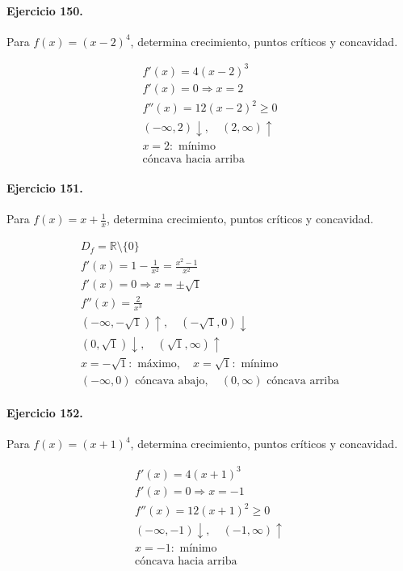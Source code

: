 \documentclass[11pt,a4paper]{article}
\begin{document}
\paragraph{Ejercicio 150.} Para $f(x)=(x-2)^4$, determina crecimiento, puntos críticos y concavidad.

\[
\begin{aligned}
f'(x)=4(x-2)^3\\
f'(x)=0\Rightarrow x=2\\
f''(x)=12(x-2)^2\ge0\\
(-\infty,2)\downarrow,\quad(2,\infty)\uparrow\\
x=2:\text{ mínimo}\\
\text{{cóncava hacia arriba}}
\end{aligned}
\]


\paragraph{Ejercicio 151.} Para $f(x)=x+\frac{1}{x}$, determina crecimiento, puntos críticos y concavidad.

\[
\begin{aligned}
D_f=\mathbb{R}\setminus\{0\}\\
f'(x)=1-\frac{1}{x^2}=\frac{x^2-1}{x^2}\\
f'(x)=0\Rightarrow x=\pm \sqrt{1}\\
f''(x)=\frac{2}{x^3}\\
(-\infty,-\sqrt{1})\uparrow,\quad(-\sqrt{1},0)\downarrow\\
(0,\sqrt{1})\downarrow,\quad(\sqrt{1},\infty)\uparrow\\
x=-\sqrt{1}:\text{ máximo},\quad x=\sqrt{1}:\text{ mínimo}\\
(-\infty,0)\text{{ cóncava abajo}},\quad(0,\infty)\text{{ cóncava arriba}}
\end{aligned}
\]


\paragraph{Ejercicio 152.} Para $f(x)=(x+1)^4$, determina crecimiento, puntos críticos y concavidad.

\[
\begin{aligned}
f'(x)=4(x+1)^3\\
f'(x)=0\Rightarrow x=-1\\
f''(x)=12(x+1)^2\ge0\\
(-\infty,-1)\downarrow,\quad(-1,\infty)\uparrow\\
x=-1:\text{ mínimo}\\
\text{{cóncava hacia arriba}}
\end{aligned}
\]
\end{document}
